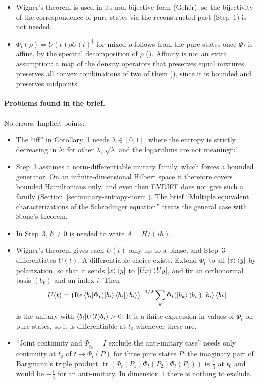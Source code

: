 \documentclass[11pt]{article}
\begin{document}
\begin{itemize}
  (Section~\ref{sec:unitary-entropy-every-time}).
\item Wigner's theorem is used in its non-bijective form (Geh\'er), so the bijectivity of the
  correspondence of pure states via the reconstructed past (Step~1) is not needed.
\item $\Phi_t(\rho) = U(t)\rho U(t)^\dagger$ for mixed $\rho$ follows from the pure states once
  $\Phi_t$ is affine, by the spectral decomposition of $\rho$
  (). Affinity is not an extra assumption: a map of the
  density operators that preserves equal mixtures preserves all convex combinations of two of
  them (), since it is bounded and preserves midpoints.
\end{itemize}

\paragraph{Problems found in the brief.} No errors. Implicit points:
\begin{itemize}
\item The ``iff'' in Corollary~1 needs $\lambda \in [0,1]$, where the entropy is strictly
  decreasing in $\lambda$; for other $\lambda$, $\sqrt\lambda$ and the logarithms are not
  meaningful.
\item Step~3 assumes a norm-differentiable unitary family, which forces a bounded generator. On
  an infinite-dimensional Hilbert space it therefore covers bounded Hamiltonians only, and even
  then EVDIFF does not give such a family
  (Section~\ref{sec:unitary-entropy-norm}). The brief ``Multiple
  equivalent characterizations of the Schr\"odinger equation'' treats the general case with
  Stone's theorem.
\item In Step~3, $\hbar \ne 0$ is needed to write $A = H/(i\hbar)$.
\item Wigner's theorem gives each $U(t)$ only up to a phase, and Step~3 differentiates $U(t)$. A
  differentiable choice exists. Extend $\Phi_t$ to all $\ket{x}\bra{y}$ by polarization, so
  that it sends $\ket{x}\bra{y}$ to $\ket{Ux}\bra{Uy}$, and fix an orthonormal basis $(b_k)$ and
  an index $i$. Then
  \[ U(t) = \bigl(\operatorname{Re}\braket{b_i|\Phi_t(\ket{b_i}\bra{b_i})\,b_i}\bigr)^{-1/2}
    \sum_k \Phi_t(\ket{b_k}\bra{b_i})\,\ket{b_i}\bra{b_k} \]
  is the unitary with $\braket{b_i|U(t)b_i} > 0$. It is a finite expression in values of $\Phi_t$ on pure states, so
  it is differentiable at $t_0$ whenever these are.
\item ``Joint continuity and $\Phi_{t_0} = I$ exclude the anti-unitary case'' needs only continuity
  at $t_0$ of $t \mapsto \Phi_t(P)$ for three pure states $P$: the imaginary part of Bargmann's
  triple product $\operatorname{tr}(\Phi_t(P_1)\Phi_t(P_2)\Phi_t(P_3))$ is $\tfrac14$ at $t_0$ and
  would be $-\tfrac14$ for an anti-unitary. In dimension $1$ there is nothing to exclude.
\end{itemize}
\end{document}
